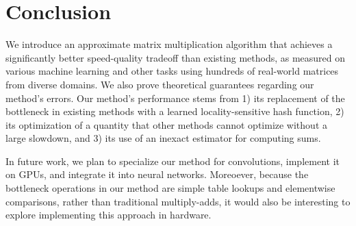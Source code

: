 \documentclass{article}  %
\begin{document}


\vspace{-2.5mm}
\section{Conclusion}
\vspace{-.5mm}

We introduce an approximate matrix multiplication algorithm that achieves a significantly better speed-quality tradeoff than existing methods, as measured on various machine learning and other tasks using hundreds of real-world matrices from diverse domains. We also prove theoretical guarantees regarding our method's errors. Our method's performance stems from 1) its replacement of the bottleneck in existing methods with a learned locality-sensitive hash function, 2) its optimization of a quantity that other methods cannot optimize without a large slowdown, and 3) its use of an inexact estimator for computing sums.

In future work, we plan to specialize our method for convolutions, implement it on GPUs, and integrate it into neural networks. Moreoever, because the bottleneck operations in our method are simple table lookups and elementwise comparisons, rather than traditional multiply-adds, it would also be interesting to explore implementing this approach in hardware.





% 
% 
% 
% 

% 




\clearpage
\newpage  %
\appendix

\end{document}
